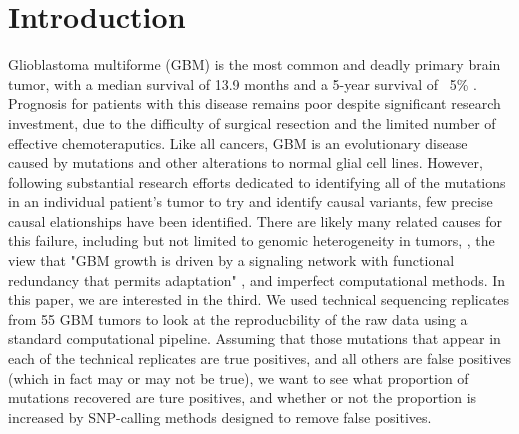 \documentclass[11pt]{article} %
\begin{document}
\section{Introduction}

Glioblastoma multiforme (GBM) is the most common and deadly primary brain tumor, with a median survival of 13.9 months and a 5-year survival of ~5\% \cite{TCGA-GBM-13}. Prognosis for patients with this disease remains poor despite significant research investment, due to the difficulty of surgical resection and the limited number of effective chemoteraputics. Like all cancers, GBM is an evolutionary disease caused by mutations and other alterations to normal glial cell lines. However, following substantial research efforts dedicated to identifying all of the mutations in an individual patient's tumor to try and identify causal variants, few precise causal elationships have been identified. There are likely many related causes for this failure, including but not limited to genomic heterogeneity in tumors, \cite{ValentineD}, the view that "GBM growth is driven by a signaling network with functional redundancy that permits adaptation" \cite{TCGA-GBM-13}, and imperfect computational methods. 
In this paper, we are interested in the third. We used technical sequencing replicates from 55 GBM tumors to look at the reproducbility of the raw data using a standard computational pipeline. Assuming that those mutations that appear in each of the technical replicates are true positives, and all others are false positives (which in fact may or may not be true), we want to see what proportion of mutations recovered are ture positives, and whether or not the proportion is increased by SNP-calling methods designed to remove false positives.
\end{document}
